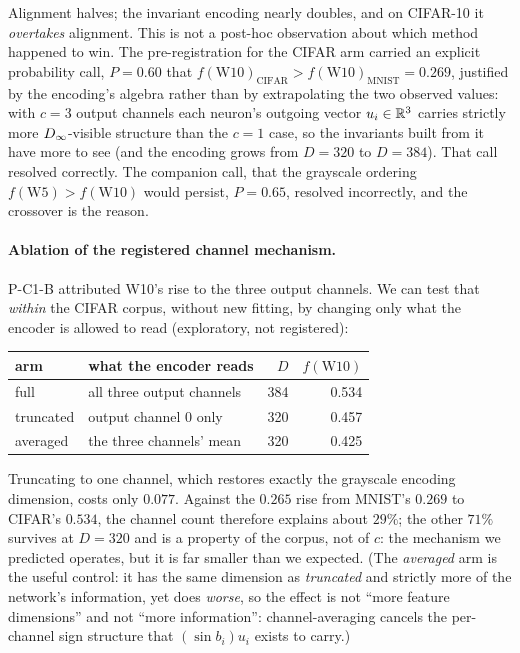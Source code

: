 Alignment halves; the invariant encoding nearly doubles, and on CIFAR-10 it \emph{overtakes}
alignment. This is not a post-hoc observation about which method happened to win. The
pre-registration for the CIFAR arm carried an explicit probability call, $P = 0.60$ that
$f(\mathrm{W10})_{\text{CIFAR}} > f(\mathrm{W10})_{\text{MNIST}} = 0.269$, justified by the
encoding's algebra rather than by extrapolating the two observed values: with $c = 3$ output
channels each neuron's outgoing vector $u_i \in \mathbb{R}^3$ carries strictly more $D_\infty$-visible
structure than the $c = 1$ case, so the invariants built from it have more to see (and the
encoding grows from $D = 320$ to $D = 384$). That call resolved correctly. The companion call, that the grayscale ordering $f(\mathrm{W5}) > f(\mathrm{W10})$ would persist, $P = 0.65$, resolved incorrectly, and the crossover is the reason.

\paragraph{Ablation of the registered channel mechanism.} P-C1-B attributed W10's rise to
the three output channels. We can test that \emph{within} the CIFAR corpus, without new fitting,
by changing only what the encoder is allowed to read (exploratory, not registered):

\begin{center}\small
\begin{tabular}{@{}llrr@{}}
\toprule
arm & what the encoder reads & $D$ & $f(\mathrm{W10})$ \\
\midrule
full        & all three output channels                & 384 & 0.534 \\
truncated   & output channel 0 only                    & 320 & 0.457 \\
averaged    & the three channels' mean                 & 320 & 0.425 \\
\bottomrule
\end{tabular}
\end{center}

Truncating to one channel, which restores exactly the grayscale encoding dimension, costs only $0.077$. Against the $0.265$ rise from MNIST's $0.269$ to CIFAR's $0.534$, the channel count
therefore explains about $29\%$; the other $71\%$ survives at $D = 320$ and is a property of the
corpus, not of $c$: the mechanism we predicted operates, but it is far smaller than we expected. (The \emph{averaged} arm is
the useful control: it has the same dimension as \emph{truncated} and strictly more of the
network's information, yet does \emph{worse}, so the effect is not ``more feature dimensions'' and
not ``more information'': channel-averaging cancels the per-channel sign structure that
$(\sin b_i)u_i$ exists to carry.)

